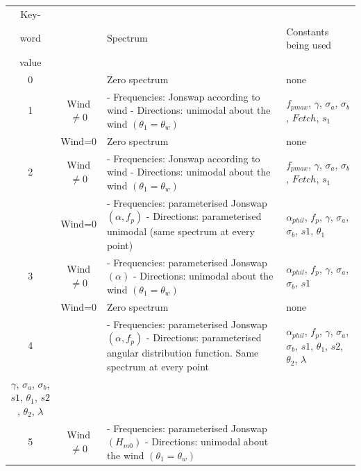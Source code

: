 \begin{table}
\begin{tabular}{|c|c|p{2.2in}|p{1.8in}|} \hline
Key- &  &  &  \\ 
word  &  & Spectrum & Constants  being used \\ 
 value &  & &  \\ \hline
0 &  & Zero spectrum & none \\ \hline
1 & Wind$\ne 0$ & - Frequencies: Jonswap according to wind  \newline - Directions: unimodal about the wind $(\theta_1 = \theta_w)$&
$f_{pmax}$, $ \gamma $, $ \sigma_a$, $ \sigma_b$, $Fetch$, $ s_1 $  \\ \hline
 & Wind=0 & Zero spectrum & none \\ \hline
2 & Wind$\ne 0$ & - Frequencies: Jonswap according to wind \newline - Directions: unimodal about the wind $(\theta_1 = \theta_w)$ &
$f_{pmax}$, $ \gamma $, $ \sigma_a$, $ \sigma_b$, $Fetch$, $ s_1 $ \\ \hline
& Wind=0 & - Frequencies: parameterised Jonswap $(\alpha , f_p)$ \newline - Directions: parameterised unimodal
(same spectrum at every point) & $\alpha_{phil}$, $ f_p$, $ \gamma $, $ \sigma_a$, $ \sigma_b$, $ s1$, $ \theta_1$ \\ \hline
3 & Wind$\ne0$ & - Frequencies: parameterised Jonswap $(\alpha)$ \newline - Directions: unimodal about the wind $(\theta_1 = \theta_w)$ &
$\alpha_{phil}$, $ f_p$, $ \gamma $, $ \sigma_a$, $ \sigma_b$, $ s1$ \\ \hline
 & Wind=0 & Zero spectrum & none \\ \hline
4 &  & - Frequencies: parameterised Jonswap $(\alpha , f_p)$  \newline  - Directions: parameterised angular distribution function.
Same spectrum at every point& $\alpha_{phil}$, $ f_p$, $ \gamma $, $ \sigma_a$, $ \sigma_b$, $ s1$, $ \theta_1$, $ s2$, $ \theta_2$,
$ \lambda$ \\ \hline
$ \gamma $, $ \sigma_a$, $ \sigma_b$, $s1$, $ \theta_1$, $ s2$, $ \theta_2$, $ \lambda$ \\ \hline
5 & Wind$\ne 0$ & - Frequencies: parameterised Jonswap $(H_{m0})$ \newline - Directions: unimodal about the wind  $(\theta_1 = \theta_w)$

\end{tabular}
\end{table}
